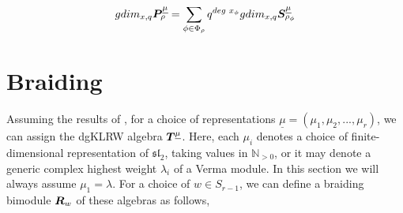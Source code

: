 \documentclass{article}
\begin{document}
\begin{cor}\label{cor:gdimPandS}
    $$gdim_{x,q}{\boldsymbol{P}}_\rho ^{\underline{\mu}} = \sum_{\phi\in \Phi_\rho} q^{deg\hspace{1mm}x_\phi} gdim_{x,q} {\boldsymbol{S}}^{\underline{\mu}}_{\rho_\phi}$$
\end{cor}

\section{Braiding}\label{sec:braiding}
Assuming the results of \cite{Na}, for a choice of representations $\underline{\mu} = (\mu_1, \mu_2, ..., \mu_r)$, we can assign the dgKLRW algebra ${\boldsymbol{T}}^{\underline{\mu}}$. Here, each $\mu_i$ denotes a choice of finite-dimensional representation of $\mathfrak{sl}_2$, taking values in $\mathbb{N}_{>0}$, or it may denote a generic complex highest weight $\lambda_i$ of a Verma module. In this section we will always assume $\mu_1 =\lambda$. For a choice of $w\in S_{r-1}$, we can define a braiding bimodule ${\boldsymbol{R}}_w$ of these algebras as follows, 
\end{document}
